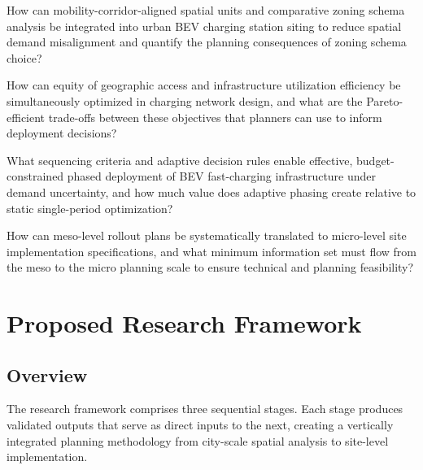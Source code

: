 \documentclass[12pt,letterpaper]{article}
\begin{document}
\begin{description}[leftmargin=1em,labelindent=0em]

\item[\textbf{RQ1} (Gaps 1 \& 2):] How can mobility-corridor-aligned
  spatial units and comparative zoning schema analysis be integrated into
  urban BEV charging station siting to reduce spatial demand misalignment
  and quantify the planning consequences of zoning schema choice?

\item[\textbf{RQ2} (Gap 3):] How can equity of geographic access and
  infrastructure utilization efficiency be simultaneously optimized in
  charging network design, and what are the Pareto-efficient trade-offs
  between these objectives that planners can use to inform deployment
  decisions?

\item[\textbf{RQ3} (Gap 4):] What sequencing criteria and adaptive
  decision rules enable effective, budget-constrained phased deployment
  of BEV fast-charging infrastructure under demand uncertainty, and how
  much value does adaptive phasing create relative to static single-period
  optimization?

\item[\textbf{RQ4} (Gap 5):] How can meso-level rollout plans be
  systematically translated to micro-level site implementation
  specifications, and what minimum information set must flow from the
  meso to the micro planning scale to ensure technical and planning
  feasibility?

\end{description}

\section{Proposed Research Framework}

\subsection{Overview}

The research framework comprises three sequential stages.  Each stage
produces validated outputs that serve as direct inputs to the next,
creating a vertically integrated planning methodology from city-scale
spatial analysis to site-level implementation.
\end{document}
